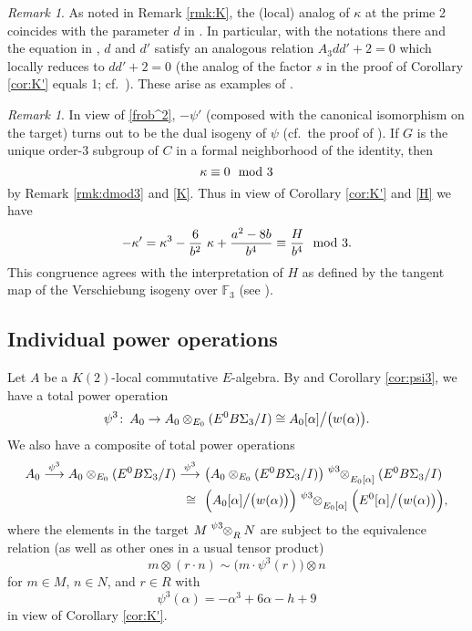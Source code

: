 \documentclass{gtpart}
\theoremstyle{definition}
\theoremstyle{remark}
\newtheorem{rmk}[thm]{Remark}
\def\co{\colon\thinspace}
\newcommand{\mb}[1]{\mathbb{#1}}
\newcommand{\BF}{{\mb F}}
\newcommand{\md}{~~{\rm mod}~}
\newcommand{\A}{\alpha}
\newcommand{\K}{\kappa}
\newcommand{\p}{\psi^3}
\begin{document}
\begin{rmk}
\label{rmk:KK'}
 As noted in Remark \ref{rmk:K}, the (local) analog of $\K$ at the prime 
 2 coincides with the parameter $d$ in \cite[Section 3]{h2p2}.  In 
 particular, with the notations there and the equation in 
 \cite[Proposition 3.2]{tmf3}, $d$ and $d'$ satisfy an analogous 
 relation $A_3 d d' + 2 = 0$ which locally reduces to $d d' + 2 = 0$ 
 (the analog of the factor $s$ in the proof of Corollary \ref{cor:K'} 
 equals 1; cf.~\cite[Theorem 2.5.7]{andoduke}).  These arise as examples 
 of \cite[Lemma 3.21]{poonen}.  
\end{rmk}

\begin{rmk}
\label{rmk:K'}
 In view of \eqref{frob^2}, $-\psi'$ (composed with the canonical 
 isomorphism on the target) turns out to be the dual isogeny of $\psi$ 
 (cf.~the proof of \cite[2.9.4]{KM}).  If $G$ is the unique order-3 
 subgroup of $C$ in a formal neighborhood of the identity, then 
 \[
  \K \equiv 0 \md 3 
 \]
 by Remark \ref{rmk:dmod3} and \eqref{K}.  Thus in view of Corollary 
 \ref{cor:K'} and \eqref{H} we have 
 \[
  -\K' = \K^3 - \frac{6}{b^2} ~ \K + \frac{a^2 - 8 b}{b^4} \equiv \frac{H}{b^4} \md 3.  
 \]
 This congruence agrees with the interpretation of $H$ as defined by the 
 tangent map of the Verschiebung isogeny over $\BF_3$ (see 
 \cite[12.4.1]{KM}).  
\end{rmk}


\subsection{Individual power operations}

Let $A$ be a $K(2)$-local commutative $E$-algebra.  By \cite[3.23]{cong} 
and Corollary \ref{cor:psi3}, we have a total power operation 
\[
 \p \co A_0 \to A_0 \otimes_{E_0} (E^0 B\Sigma_3 / I) \cong A_0 [\A] \big/ \big( w(\A) \big).  
\]
We also have a composite of total power operations 
\begin{equation}
\label{psi3^2}
\begin{split}
 A_0 \stackrel{\p}{\longrightarrow} A_0 \otimes_{E_0} (E^0 B\Sigma_3 / I) \stackrel{\p}{\longrightarrow} 
 & ~ \big( A_0 \otimes_{E_0} (E^0 B\Sigma_3 / I) \big) \tensor[^\p]{\otimes}{_{E_0 [\A]}} (E^0 B\Sigma_3 / I) \\
 \cong \thinspace \thinspace & ~ \Big( A_0 [\A] \big/ \big( w(\A) \big) \Big) \tensor[^\p]{\otimes}{_{E_0 [\A]}} \Big( E^0 [\A] \big/ \big( w(\A) \big) \Big), 
\end{split}
\end{equation}
where the elements in the target $M \tensor[^\p]{\otimes}{_R} N$ are 
subject to the equivalence relation (as well as other ones in a usual 
tensor product) 
\[
 m \otimes (r \cdot n) \sim \big( m \cdot \p(r) \big) \otimes n 
\]
for $m \in M$, $n \in N$, and $r \in R$ with 
\[
 \p(\A) = -\A^3 + 6 \A - h + 9 
\]
in view of Corollary \ref{cor:K'}.  
\end{document}
